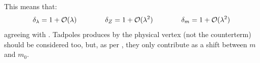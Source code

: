 This means that:
\begin{equation}
  \delta_\lambda = 1 + \mathcal{O}(\lambda)
  \qquad \qquad
  \delta_Z = 1 + \mathcal{O}(\lambda^2)
  \qquad \qquad
  \delta_m = 1 + \mathcal{O}(\lambda^2)
\end{equation}
agreeing with . Tadpoles produces by the physical vertex (not the counterterm) should be considered too, but, as per , they only contribute as a shift between $ m $ and $ m_0 $.










